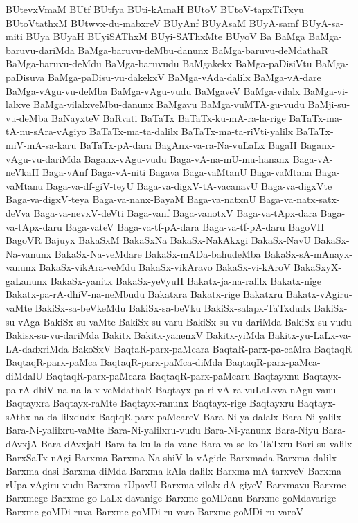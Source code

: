 {BUtevxVmaM
BUtf
BUtfya
BUti-kAmaH
BUtoV
BUtoV-tapxTiTxyu
BUtoVtathxM
BUtwvx-du-mabxreV
BUyAnf
BUyAsaM
BUyA-samf
BUyA-sa-miti
BUya
BUyaH
BUyiSAThxM
BUyi-SAThxMte
BUyoV
Ba
BaMga
BaMga-baruvu-dariMda
BaMga-baruvu-deMbu-danunx
BaMga-baruvu-deMdathaR
BaMga-baruvu-deMdu
BaMga-baruvudu
BaMgakekx
BaMga-paDisiVtu
BaMga-paDisuva
BaMga-paDisu-vu-dakekxV
BaMga-vAda-dalilx
BaMga-vA-dare
BaMga-vAgu-vu-deMba
BaMga-vAgu-vudu
BaMgaveV
BaMga-vilalx
BaMga-vi-lalxve
BaMga-vilalxveMbu-danunx
BaMgavu
BaMga-vuMTA-gu-vudu
BaMji-su-vu-deMba
BaNayxteV
BaRvati
BaTaTx
BaTaTx-ku-mA-ra-la-rige
BaTaTx-ma-tA-nu-sAra-vAgiyo
BaTaTx-ma-ta-dalilx
BaTaTx-ma-ta-riVti-yalilx
BaTaTx-miV-mA-sa-karu
BaTaTx-pA-dara
BagAnx-va-ra-Na-vuLaLx
BagaH
Baganx-vAgu-vu-dariMda
Baganx-vAgu-vudu
Baga-vA-na-mU-mu-hananx
Baga-vA-neVkaH
Baga-vAnf
Baga-vA-niti
Bagava
Baga-vaMtanU
Baga-vaMtana
Baga-vaMtanu
Baga-va-df-giV-teyU
Baga-va-digxV-tA-vacanavU
Baga-va-digxVte
Baga-va-digxV-teya
Baga-va-nanx-BayaM
Baga-va-natxnU
Baga-va-natx-satx-deVva
Baga-va-nevxV-deVti
Baga-vanf
Baga-vanotxV
Baga-va-tApx-dara
Baga-va-tApx-daru
Baga-vateV
Baga-va-tf-pA-dara
Baga-va-tf-pA-daru
BagoVH
BagoVR
Bajuyx
BakaSxM
BakaSxNa
BakaSx-NakAkxgi
BakaSx-NavU
BakaSx-Na-vanunx
BakaSx-Na-veMdare
BakaSx-mADa-bahudeMba
BakaSx-sA-mAnayx-vanunx
BakaSx-vikAra-veMdu
BakaSx-vikAravo
BakaSx-vi-kAroV
BakaSxyX-gaLanunx
BakaSx-yanitx
BakaSx-yeVyuH
Bakatx-ja-na-ralilx
Bakatx-nige
Bakatx-pa-rA-dhiV-na-neMbudu
Bakatxra
Bakatx-rige
Bakatxru
Bakatx-vAgiru-vaMte
BakiSx-sa-beVkeMdu
BakiSx-sa-beVku
BakiSx-salapx-TaTxdudx
BakiSx-su-vAga
BakiSx-su-vaMte
BakiSx-su-varu
BakiSx-su-vu-dariMda
BakiSx-su-vudu
Bakisx-su-vu-dariMda
Bakitx
Bakitx-yanenxV
Bakitx-yiMda
Bakitx-yu-LaLx-va-LA-dadxriMda
BakoSxV
BaqtaR-parx-paMcara
BaqtaR-parx-pa-caMra
BaqtaqR
BaqtaqR-parx-paMca
BaqtaqR-parx-paMca-diMda
BaqtaqR-parx-paMca-diMdalU
BaqtaqR-parx-paMcara
BaqtaqR-parx-paMcaru
Baqtayxnu
Baqtayx-pa-rA-dhiV-na-na-lalx-veMdathaR
Baqtayx-pa-ri-vA-ra-vuLaLxva-nAgu-vanu
Baqtayxra
Baqtayx-raMte
Baqtayx-ranunx
Baqtayx-rige
Baqtayxru
Baqtayx-sAthx-na-da-lilxdudx
BaqtqR-parx-paMcareV
Bara-Ni-ya-dalalx
Bara-Ni-yalilx
Bara-Ni-yalilxru-vaMte
Bara-Ni-yalilxru-vudu
Bara-Ni-yanunx
Bara-Niyu
Bara-dAvxjA
Bara-dAvxjaH
Bara-ta-ku-la-da-vane
Bara-va-se-ko-TaTxru
Bari-su-valilx
BarxSaTx-nAgi
Barxma
Barxma-Na-shiV-la-vAgide
Barxmada
Barxma-dalilx
Barxma-dasi
Barxma-diMda
Barxma-kAla-dalilx
Barxma-mA-tarxveV
Barxma-rUpa-vAgiru-vudu
Barxma-rUpavU
Barxma-vilalx-dA-giyeV
Barxmavu
Barxme
Barxmege
Barxme-go-LaLx-davanige
Barxme-goMDanu
Barxme-goMdavarige
Barxme-goMDi-ruva
Barxme-goMDi-ru-varo
Barxme-goMDi-ru-varoV
}
